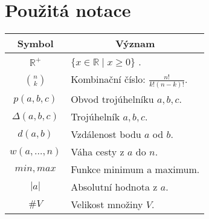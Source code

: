 \chapter*{Použitá notace}
\label{sec:notace}
\noindent
\begin{table}[h]
    \centering
\begin{tabular}{c l}
    Symbol & \multicolumn{1}{c}{Význam} \\
    \toprule
    $\mathbb{R}^+$ & $\{ x \in \mathbb{R} \mid x \geq 0 \}$ .\\
    $ \binom{n}{k}$ & Kombinační číslo: $\frac{n!}{k!(n-k)!}$. \\
    $ p(a, b, c)$ & Obvod trojúhelníku $a, b, c$. \\
    $\Delta(a,b,c)$ & Trojúhelník $a, b, c$.\\
    $ d(a, b)$ & Vzdálenost bodu $a$ od $b$. \\
    $ w(a, \ldots, n)$ & Váha cesty z $a$ do $n$. \\
    $min, max$ & Funkce minimum a maximum. \\
    $ |a| $ & Absolutní hodnota z $a$. \\
    $ \#V $& Velikost množiny $V$. \\
\end{tabular}
\end{table}